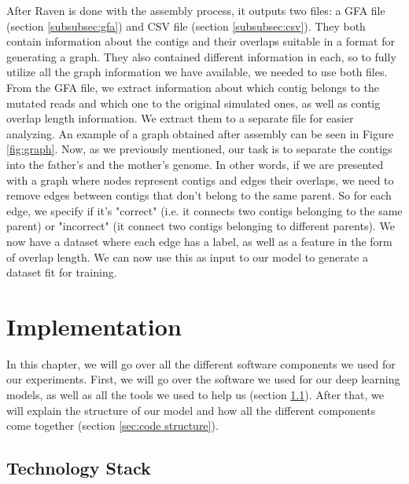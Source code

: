 \documentclass[times, utf8, diplomski, english]{fer_eng}
\begin{document}
After Raven is done with the assembly process, it outputs two files: a GFA file (section \ref{subsubsec:gfa}) and CSV file (section \ref{subsubsec:csv}). They both contain information about the contigs and their overlaps suitable in a format for generating a graph. They also contained different information in each, so to fully utilize all the graph information we have available, we needed to use both files. From the GFA file, we extract information about which contig belongs to the mutated reads and which one to the original simulated ones, as well as contig overlap length information. We extract them to a separate file for easier analyzing. An example of a graph obtained after assembly can be seen in Figure \ref{fig:graph}. Now, as we previously mentioned, our task is to separate the contigs into the father's and the mother's genome. In other words, if we are presented with a graph where nodes represent contigs and edges their overlaps, we need to remove edges between contigs that don't belong to the same parent. So for each edge, we specify if it's "correct" (i.e. it connects two contigs belonging to the same parent) or "incorrect" (it connect two contigs belonging to different parents). We now have a dataset where each edge has a label, as well as a feature in the form of overlap length. We can now use this as input to our model to generate a dataset fit for training.

\chapter{Implementation}

In this chapter, we will go over all the different software components we used for our experiments. First, we will go over the software we used for our deep learning models, as well as all the tools we used to help us (section \ref{sec:technology stack}). After that, we will explain the structure of our model and how all the different components come together (section \ref{sec:code structure}).

\section{Technology Stack}
\label{sec:technology stack}
\end{document}
